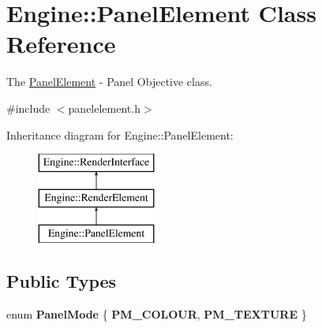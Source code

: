 \hypertarget{classEngine_1_1PanelElement}{}\section{Engine\+:\+:Panel\+Element Class Reference}
\label{classEngine_1_1PanelElement}


The \hyperlink{classEngine_1_1PanelElement}{Panel\+Element} -\/ Panel Objective class.  




{\ttfamily \#include $<$panelelement.\+h$>$}

Inheritance diagram for Engine\+:\+:Panel\+Element\+:\begin{figure}[H]
\begin{center}
\leavevmode
\includegraphics[height=3.000000cm]{classEngine_1_1PanelElement}
\end{center}
\end{figure}
\subsection*{Public Types}
\begin{DoxyCompactItemize}
\item 
\hypertarget{classEngine_1_1PanelElement_a2b606660873181f287c68d7b6f649821}{}enum {\bfseries Panel\+Mode} \{ {\bfseries P\+M\+\_\+\+C\+O\+L\+O\+U\+R}, 
{\bfseries P\+M\+\_\+\+T\+E\+X\+T\+U\+R\+E}
 \}\label{classEngine_1_1PanelElement_a2b606660873181f287c68d7b6f649821}

\end{DoxyCompactItemize}
